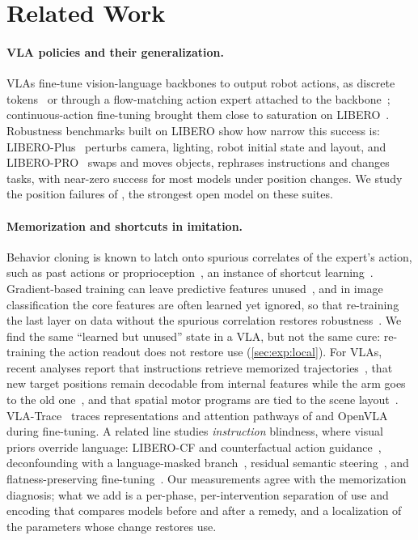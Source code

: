\section{Related Work}
\label{sec:related}

\paragraph{VLA policies and their generalization.}
VLAs fine-tune vision-language backbones to output robot actions, as discrete tokens~\cite{brohan2023rt2,kim2024openvla}
or through a flow-matching action expert attached to the backbone~\cite{black2024pi0,pi2025pi05}; continuous-action
fine-tuning brought them close to saturation on LIBERO~\cite{liu2023libero,kim2025oft}.
Robustness benchmarks built on LIBERO show how narrow this success is: LIBERO-Plus~\cite{fei2025liberoplus} perturbs
camera, lighting, robot initial state and layout, and LIBERO-PRO~\cite{zhou2025liberopro} swaps and moves objects,
rephrases instructions and changes tasks, with near-zero success for most models under position changes.
We study the position failures of \pizf, the strongest open model on these suites.

\paragraph{Memorization and shortcuts in imitation.}
Behavior cloning is known to latch onto spurious correlates of the expert's action, such as past actions or
proprioception~\cite{dehaan2019causal,wen2020copycat}, an instance of shortcut learning~\cite{geirhos2020shortcut}.
Gradient-based training can leave predictive features unused~\cite{shah2020pitfalls,pezeshki2021gradient}, and in image
classification the core features are often learned yet ignored, so that re-training the last layer on data without the
spurious correlation restores robustness~\cite{kirichenko2023dfr}. We find the same ``learned but unused'' state in a VLA,
but not the same cure: re-training the action readout does not restore use (\cref{sec:exp:local}).
For VLAs, recent analyses report that instructions retrieve memorized trajectories~\cite{chen2026ect}, that new target
positions remain decodable from internal features while the arm goes to the old one~\cite{encoded2026}, and that spatial
motor programs are tied to the scene layout~\cite{features2026}.
VLA-Trace~\cite{shi2026vlatrace} traces representations and attention pathways of \pizf and OpenVLA during fine-tuning.
A related line studies \emph{instruction} blindness, where visual priors override language: LIBERO-CF and counterfactual
action guidance~\cite{fang2026whenvision}, deconfounding with a language-masked branch~\cite{zhang2026cofactvla}, residual
semantic steering~\cite{zhan2026stable}, and flatness-preserving fine-tuning~\cite{flatness2026}.
Our measurements agree with the memorization diagnosis; what we add is a per-phase, per-intervention separation of use and
encoding that compares models before and after a remedy, and a localization of the parameters whose change restores use.

